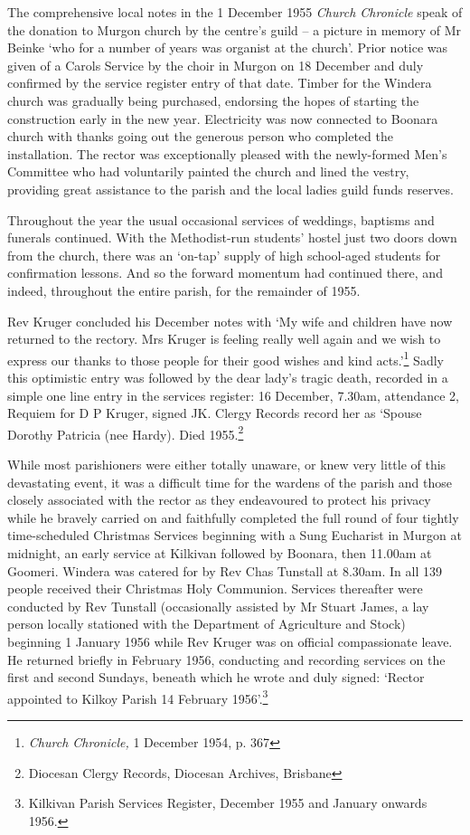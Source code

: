 The comprehensive local notes in the 1 December 1955 \emph{Church
Chronicle} speak of the donation to Murgon church by the centre's guild
-- a picture in memory of Mr Beinke `who for a number of years was
organist at the church'. Prior notice was given of a Carols Service by
the choir in Murgon on 18 December and duly confirmed by the service
register entry of that date. Timber for the Windera church was gradually
being purchased, endorsing the hopes of starting the construction early
in the new year. Electricity was now connected to Boonara church with
thanks going out the generous person who completed the installation. The
rector was exceptionally pleased with the newly-formed Men's Committee
who had voluntarily painted the church and lined the vestry, providing
great assistance to the parish and the local ladies guild funds
reserves.

Throughout the year the usual occasional services of weddings, baptisms
and funerals continued. With the Methodist-run students' hostel just two
doors down from the church, there was an `on-tap' supply of high
school-aged students for confirmation lessons. And so the forward
momentum had continued there, and indeed, throughout the entire parish,
for the remainder of 1955.

Rev Kruger concluded his December notes with `My wife and children have
now returned to the rectory. Mrs Kruger is feeling really well again and
we wish to express our thanks to those people for their good wishes and
kind acts.'\footnote{\emph{Church Chronicle,} 1 December 1954, p. 367}
Sadly this optimistic entry was followed by the dear lady's tragic
death, recorded in a simple one line entry in the services register: 16
December, 7.30am, attendance 2, Requiem for D P Kruger, signed JK.
Clergy Records record her as `Spouse Dorothy Patricia (nee Hardy). Died
1955.\footnote{Diocesan Clergy Records, Diocesan Archives, Brisbane}

While most parishioners were either totally unaware, or knew very little
of this devastating event, it was a difficult time for the wardens of
the parish and those closely associated with the rector as they
endeavoured to protect his privacy while he bravely carried on and
faithfully completed the full round of four tightly time-scheduled
Christmas Services beginning with a Sung Eucharist in Murgon at
midnight, an early service at Kilkivan followed by Boonara, then 11.00am
at Goomeri. Windera was catered for by Rev Chas Tunstall at 8.30am. In
all 139 people received their Christmas Holy Communion. Services
thereafter were conducted by Rev Tunstall (occasionally assisted by Mr
Stuart James, a lay person locally stationed with the Department of
Agriculture and Stock) beginning 1 January 1956 while Rev Kruger was on
official compassionate leave. He returned briefly in February 1956,
conducting and recording services on the first and second Sundays,
beneath which he wrote and duly signed: `Rector appointed to Kilkoy
Parish 14 February 1956'.\footnote{Kilkivan Parish Services Register,
  December 1955 and January onwards 1956.}


